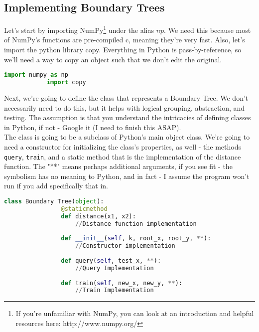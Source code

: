 \documentclass[12pt,letterpaper]{article}
\begin{document}
		\subsection{Implementing Boundary Trees}
			Let's start by importing NumPy\footnote{If you're unfamiliar with NumPy, you can look at an introduction and helpful resources here: http://www.numpy.org/} under the alias $np$. We need this because most of NumPy's functions are pre-compiled c, meaning they're very fast. Also, let's import the python library copy. Everything in Python is pass-by-reference, so we'll need a way to copy an object such that we don't edit the original.
			\begin{lstlisting}[language=Python]
			import numpy as np
			import copy\end{lstlisting}
			Next, we're going to define the class that represents a Boundary Tree. We don't necessarily need to do this, but it helps with logical grouping, abstraction, and testing. The assumption is that you understand the intricacies of defining classes in Python, if not - Google it (I need to finish this ASAP). \\
			The class is going to be a subclass of Python's main object class. We're going to need a constructor for initializing the class's properties, as well - the methods \texttt{query}, \texttt{train}, and a static method that is the implementation of the distance function. The "**" means perhaps additional arguments, if you see fit - the symbolism has no meaning to Python, and in fact - I assume the program won't run if you add specifically that in. 
			\begin{lstlisting}[language=Python]
			class Boundary Tree(object):
				@staticmethod
				def distance(x1, x2):
					//Distance function implementation
				
				def __init__(self, k, root_x, root_y, **):
					//Constructor implementation
				
				def query(self, test_x, **):
					//Query Implementation
				
				def train(self, new_x, new_y, **):
					//Train Implementation
			\end{lstlisting}
			
\end{document}

